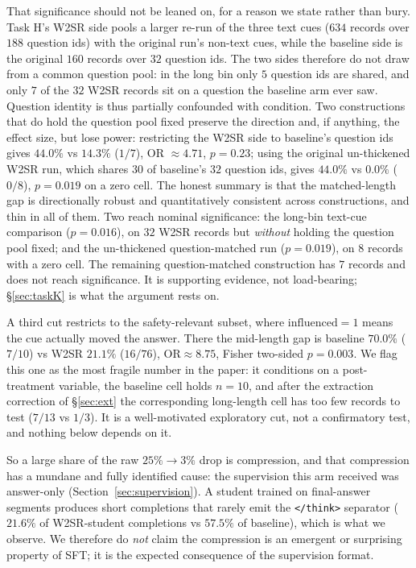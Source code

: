 \documentclass{article}
\begin{document}
That significance should not be leaned on, for a reason we state rather than
bury. Task H's W2SR side pools a larger re-run of the three text cues
($634$ records over $188$ question ids) with the original run's non-text cues,
while the baseline side is the original $160$ records over $32$ question ids.
The two sides therefore do not draw from a common question pool: in the long
bin only $5$ question ids are shared, and only $7$ of the $32$ W2SR records
sit on a question the baseline arm ever saw. Question identity is thus
partially confounded with condition. Two constructions that do hold the
question pool fixed preserve the direction and, if anything, the effect size,
but lose power: restricting the W2SR side to baseline's question ids gives
$44.0\%$ vs $14.3\%$ ($1/7$), OR $\approx 4.71$, $p = 0.23$; using the
original un-thickened W2SR run, which shares $30$ of baseline's $32$ question
ids, gives $44.0\%$ vs $0.0\%$ ($0/8$), $p = 0.019$ on a zero cell. The honest
summary is that the matched-length gap is directionally robust and
quantitatively consistent across constructions, and thin in all of them. Two
reach nominal significance: the long-bin text-cue comparison ($p = 0.016$), on
$32$ W2SR records but \emph{without} holding the question pool fixed; and the
un-thickened question-matched run ($p = 0.019$), on $8$ records with a zero
cell. The remaining question-matched construction has $7$ records and does not
reach significance. It is supporting evidence, not load-bearing; \S\ref{sec:taskK} is
what the argument rests on.

A third cut restricts to the safety-relevant subset, where
$\mathrm{influenced} = 1$ means the cue actually moved the answer. There the
mid-length gap is baseline $70.0\%$ ($7/10$) vs W2SR $21.1\%$ ($16/76$),
$\mathrm{OR} \approx 8.75$, Fisher two-sided $p = 0.003$. We flag this one as
the most fragile number in the paper: it conditions on a post-treatment
variable, the baseline cell holds $n = 10$, and after the extraction
correction of \S\ref{sec:ext} the corresponding long-length cell has too few
records to test ($7/13$ vs $1/3$). It is a well-motivated exploratory cut, not
a confirmatory test, and nothing below depends on it.

So a large share of the raw $25\% \to 3\%$ drop is compression, and that
compression has a mundane and fully identified cause: the supervision this arm
received was answer-only (Section~\ref{sec:supervision}). A student trained on
final-answer segments produces short completions that rarely emit the
\texttt{</think>} separator ($21.6\%$ of W2SR-student completions vs $57.5\%$ of
baseline), which is what we observe. We therefore do \emph{not} claim the
compression is an emergent or surprising property of SFT; it is the expected
consequence of the supervision format.
\end{document}
